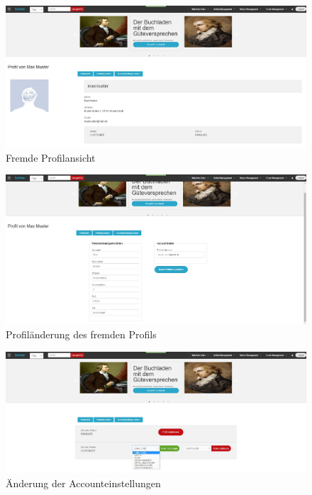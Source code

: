 \documentclass[a4paper]{article}
\begin{document}
\begin{figure}[ht]
\centering
\includegraphics[width=1.0\textwidth]{Profil_fremd.jpg}
\caption{Fremde Profilansicht}
\end{figure}
\smallskip

\begin{figure}[ht]
\centering
\includegraphics[width=1.0\textwidth]{Profilaenderung_fremd.jpg}
\caption{Profiländerung des fremden Profils}
\end{figure}
\smallskip

\begin{figure}[ht]
\centering
\includegraphics[width=1.0\textwidth]{Accountdaten.jpg}
\caption{Änderung der Accounteinstellungen}
\end{figure}
\smallskip
\end{document}
